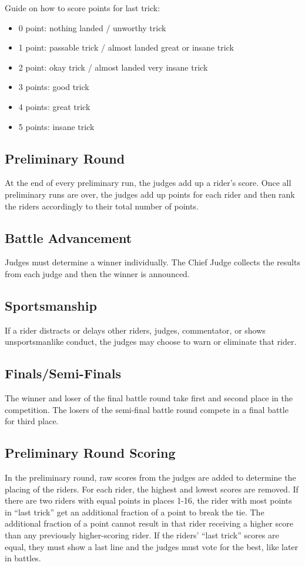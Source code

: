 Guide on how to score points for last trick:
\begin{itemize}
\item 0 point: nothing landed / unworthy trick
\item 1 point: passable trick / almost landed great or insane trick
\item 2 point: okay trick / almost landed very insane trick
\item 3 points: good trick
\item 4 points: great trick
\item 5 points: insane trick
\end{itemize}

\subsection{Preliminary Round}
At the end of every preliminary run, the judges add up a rider's score.
Once all preliminary runs are over, the judges add up points for each rider and then rank the riders accordingly to their total number of points.


\subsection{Battle Advancement \label{subsec:flat\itemstreet_flatland\itemjudging\itemscoring_battle}}
Judges must determine a winner individually.
The Chief Judge collects the results from each judge and then the winner is announced.

\subsection{Sportsmanship}
If a rider distracts or delays other riders, judges, commentator, or shows unsportsmanlike conduct, the judges may choose to warn or eliminate that rider.

\subsection{Finals/Semi-Finals}
The winner and loser of the final battle round take first and second place in the competition. The losers of the semi-final battle round compete in a final battle for third place.

\subsection{Preliminary Round Scoring}
In the preliminary round, raw scores from the judges are added to determine the placing of the riders.
For each rider, the highest and lowest scores are removed. %
If there are two riders with equal points in places 1-16, the rider with most points in ``last trick'' get an additional fraction of a point to break the tie.
The additional fraction of a point cannot result in that rider receiving a higher score than any previously higher-scoring rider.
If the riders' ``last trick'' scores are equal, they must show a last line and the judges must vote for the best, like later in battles.

